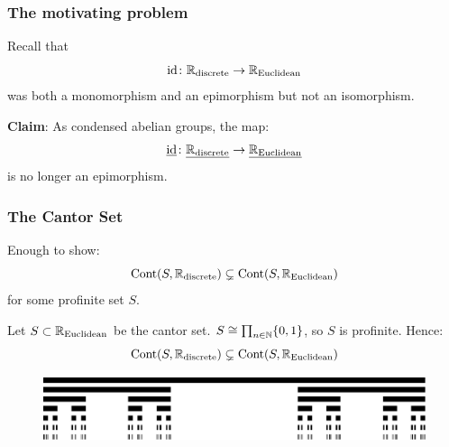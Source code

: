 \documentclass{beamer}
\DeclareMathOperator{\Cont}{Cont}
\DeclareMathOperator{\id}{id}
\begin{document}
\begin{frame}
    \frametitle{The motivating problem}

    Recall that
    \begin{equation*}
        \id \colon \bbR_{\text{discrete}} \to \bbR_{\text{Euclidean}}
    \end{equation*}
    was both a monomorphism and an epimorphism but not an isomorphism.
    \pause

    \textbf{Claim}: As condensed abelian groups, the map:
    \begin{equation*}
        \underline{\id} \colon \underline{\bbR_{\text{discrete}}} \to \underline{\bbR_{\text{Euclidean}}}
    \end{equation*}
    is no longer an epimorphism.
\end{frame}
\begin{frame}
    \frametitle{The Cantor Set}
    Enough to show:
    \begin{equation*}
        \Cont(S, \bbR_{\text{discrete}}) \subsetneq \Cont(S, \bbR_{\text{Euclidean}})
    \end{equation*}
    for some profinite set $S$.

    \pause
    \medskip

    Let $S \subset \mathbb{R}_{\text{Euclidean}}$ be the cantor set.
    $ S \cong \prod_{n\in \mathbb{N}}\{0,1\}$,
    so $S$ is profinite.
    Hence:
    \begin{equation*}
        \Cont(S, \bbR_{\text{discrete}}) \subsetneq \Cont(S, \bbR_{\text{Euclidean}})
    \end{equation*}

    \begin{figure}
        \centering
        \includegraphics[scale=0.5]{Cantor_set_in_seven_iterations.pdf}
    \end{figure}

\end{frame}
\end{document}
